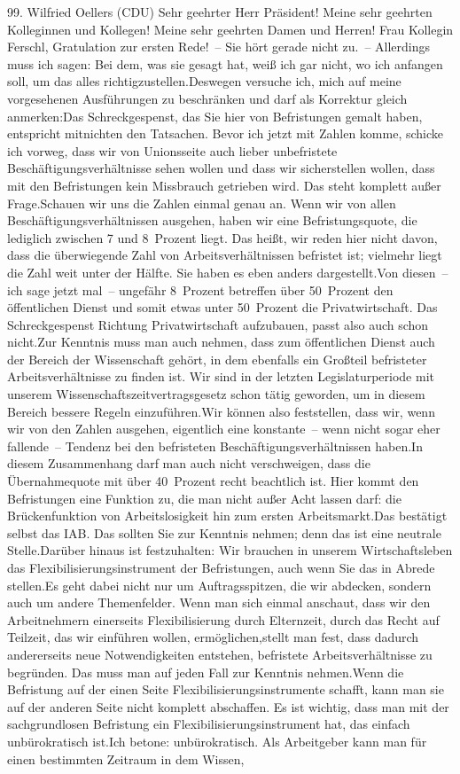 \documentclass{article}
\begin{document}
	99. Wilfried Oellers (CDU) Sehr geehrter Herr Präsident! Meine sehr geehrten Kolleginnen und Kollegen! Meine sehr geehrten Damen und Herren! Frau Kollegin Ferschl, Gratulation zur ersten Rede! – Sie hört gerade nicht zu. – Allerdings muss ich sagen: Bei dem, was sie gesagt hat, weiß ich gar nicht, wo ich anfangen soll, um das alles richtigzustellen.Deswegen versuche ich, mich auf meine vorgesehenen Ausführungen zu beschränken und darf als Korrektur gleich anmerken:Das Schreckgespenst, das Sie hier von Befristungen gemalt haben, entspricht mitnichten den Tatsachen. Bevor ich jetzt mit Zahlen komme, schicke ich vorweg, dass wir von Unionsseite auch lieber unbefristete Beschäftigungsverhältnisse sehen wollen und dass wir sicherstellen wollen, dass mit den Befristungen kein Missbrauch getrieben wird. Das steht komplett außer Frage.Schauen wir uns die Zahlen einmal genau an. Wenn wir von allen Beschäftigungsverhältnissen ausgehen, haben wir eine Befristungsquote, die lediglich zwischen 7 und 8 Prozent liegt. Das heißt, wir reden hier nicht davon, dass die überwiegende Zahl von Arbeitsverhältnissen befristet ist; vielmehr liegt die Zahl weit unter der Hälfte. Sie haben es eben anders dargestellt.Von diesen – ich sage jetzt mal – ungefähr 8 Prozent betreffen über 50 Prozent den öffentlichen Dienst und somit etwas unter 50 Prozent die Privatwirtschaft. Das Schreckgespenst Richtung Privatwirtschaft aufzubauen, passt also auch schon nicht.Zur Kenntnis muss man auch nehmen, dass zum öffentlichen Dienst auch der Bereich der Wissenschaft gehört, in dem ebenfalls ein Großteil befristeter Arbeitsverhältnisse zu finden ist. Wir sind in der letzten Legislaturperiode mit unserem Wissenschaftszeitvertragsgesetz schon tätig geworden, um in diesem Bereich bessere Regeln einzuführen.Wir können also feststellen, dass wir, wenn wir von den Zahlen ausgehen, eigentlich eine konstante – wenn nicht sogar eher fallende – Tendenz bei den befristeten Beschäftigungsverhältnissen haben.In diesem Zusammenhang darf man auch nicht verschweigen, dass die Übernahmequote mit über 40 Prozent recht beachtlich ist. Hier kommt den Befristungen eine Funktion zu, die man nicht außer Acht lassen darf: die Brückenfunktion von Arbeitslosigkeit hin zum ersten Arbeitsmarkt.Das bestätigt selbst das IAB. Das sollten Sie zur Kenntnis nehmen; denn das ist eine neutrale Stelle.Darüber hinaus ist festzuhalten: Wir brauchen in unserem Wirtschaftsleben das Flexibilisierungsinstrument der Befristungen, auch wenn Sie das in Abrede stellen.Es geht dabei nicht nur um Auftragsspitzen, die wir abdecken, sondern auch um andere Themenfelder. Wenn man sich einmal anschaut, dass wir den Arbeitnehmern einerseits Flexibilisierung durch Elternzeit, durch das Recht auf Teilzeit, das wir einführen wollen, ermöglichen,stellt man fest, dass dadurch andererseits neue Notwendigkeiten entstehen, befristete Arbeitsverhältnisse zu begründen. Das muss man auf jeden Fall zur Kenntnis nehmen.Wenn die Befristung auf der einen Seite Flexibilisierungsinstrumente schafft, kann man sie auf der anderen Seite nicht komplett abschaffen. Es ist wichtig, dass man mit der sachgrundlosen Befristung ein Flexibilisierungsinstrument hat, das einfach unbürokratisch ist.Ich betone: unbürokratisch. Als Arbeitgeber kann man für einen bestimmten Zeitraum in dem Wissen, 
\end{document}
